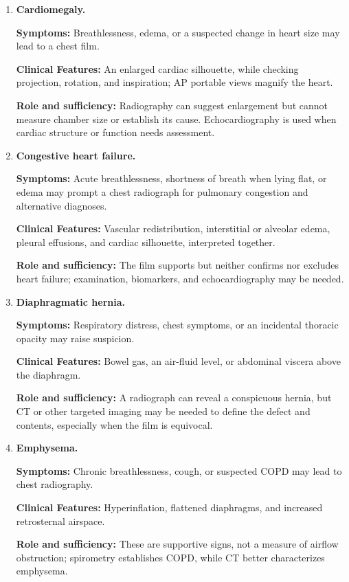 \begin{enumerate}[leftmargin=*,itemsep=0.45em,topsep=0.4em]
\item \textbf{Cardiomegaly.}\par\noindent\textbf{Symptoms:} Breathlessness, edema, or a suspected change in heart size may lead to a chest film.\par\noindent\textbf{Clinical Features:} An enlarged cardiac silhouette, while checking projection, rotation, and inspiration; AP portable views magnify the heart.\par\noindent\textbf{Role and sufficiency:} Radiography can suggest enlargement but cannot measure chamber size or establish its cause. Echocardiography is used when cardiac structure or function needs assessment.
\item \textbf{Congestive heart failure.}\par\noindent\textbf{Symptoms:} Acute breathlessness, shortness of breath when lying flat, or edema may prompt a chest radiograph for pulmonary congestion and alternative diagnoses.\par\noindent\textbf{Clinical Features:} Vascular redistribution, interstitial or alveolar edema, pleural effusions, and cardiac silhouette, interpreted together.\par\noindent\textbf{Role and sufficiency:} The film supports but neither confirms nor excludes heart failure; examination, biomarkers, and echocardiography may be needed.
\item \textbf{Diaphragmatic hernia.}\par\noindent\textbf{Symptoms:} Respiratory distress, chest symptoms, or an incidental thoracic opacity may raise suspicion.\par\noindent\textbf{Clinical Features:} Bowel gas, an air-fluid level, or abdominal viscera above the diaphragm.\par\noindent\textbf{Role and sufficiency:} A radiograph can reveal a conspicuous hernia, but CT or other targeted imaging may be needed to define the defect and contents, especially when the film is equivocal.
\item \textbf{Emphysema.}\par\noindent\textbf{Symptoms:} Chronic breathlessness, cough, or suspected COPD may lead to chest radiography.\par\noindent\textbf{Clinical Features:} Hyperinflation, flattened diaphragms, and increased retrosternal airspace.\par\noindent\textbf{Role and sufficiency:} These are supportive signs, not a measure of airflow obstruction; spirometry establishes COPD, while CT better characterizes emphysema.

\end{enumerate}
